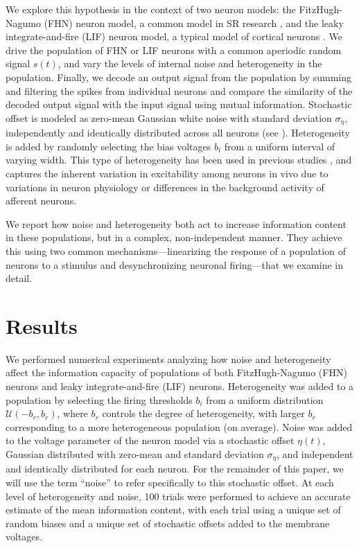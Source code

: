 \documentclass[letterpaper,11pt]{article}
\begin{document}
We explore this hypothesis in the context of two neuron models:
the FitzHugh-Nagumo (FHN) neuron model,
a common model in SR research \citep{Wiesenfeld1994,Collins1995,Longtin1998,Stocks2001},
and the leaky integrate-and-fire (LIF) neuron model,
a typical model of cortical neurons \citep{Koch1999}.
We drive the population of FHN or LIF neurons
with a common aperiodic random signal $s(t)$,
and vary the levels of internal noise and heterogeneity in the population.
Finally, we decode an output signal from the population
by summing and filtering the spikes from individual neurons
and compare the similarity of the decoded output signal
with the input signal using mutual information.
Stochastic offset is modeled as zero-mean Gaussian white noise with standard deviation $\sigma_\eta$, independently and identically distributed across all neurons (see \textsc{}). Heterogeneity is added by randomly selecting
the bias voltages $b_i$ from a uniform interval of varying width.
This type of heterogeneity has been used in previous studies \citep[e.g.,][]{Brody2003},
and captures the inherent variation in excitability among neurons in vivo \citep{Mejias2012} due to variations in neuron physiology or differences in the background activity of afferent neurons.

We report how noise and heterogeneity both act to increase information content in these populations, but in a complex, non-independent manner. They achieve this using two common mechanisms---linearizing the response of a population of neurons to a stimulus and desynchronizing neuronal firing---that we examine in detail.

\section{Results}
\label{scn:results}

We performed numerical experiments analyzing how noise and heterogeneity affect the information capacity of populations of both FitzHugh-Nagumo (FHN) neurons and leaky integrate-and-fire (LIF) neurons. Heterogeneity was added to a population by selecting the firing thresholds ${b_i}$ from a uniform distribution $\mathcal{U}(-b_r, b_r)$, where $b_r$ controls the degree of heterogeneity, with larger $b_r$ corresponding to a more heterogeneous population (on average). Noise was added to the voltage parameter of the neuron model via a stochastic offset $\eta(t)$, Gaussian distributed with zero-mean and standard deviation $\sigma_\eta$, and independent and identically distributed for each neuron. For the remainder of this paper, we will use the term ``noise'' to refer specifically to this stochastic offset. At each level of heterogeneity and noise, 100 trials were performed to achieve an accurate estimate of the mean information content, with each trial using a unique set of random biases and a unique set of stochastic offsets added to the membrane voltages.
\end{document}
